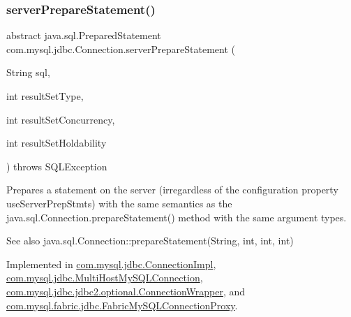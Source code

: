 \subsubsection{\texorpdfstring{server\+Prepare\+Statement()}{serverPrepareStatement()}\hspace{0.1cm}{\footnotesize\ttfamily [4/6]}}
{\footnotesize\ttfamily abstract java.\+sql.\+Prepared\+Statement com.\+mysql.\+jdbc.\+Connection.\+server\+Prepare\+Statement (\begin{DoxyParamCaption}\item[{String}]{sql,  }\item[{int}]{result\+Set\+Type,  }\item[{int}]{result\+Set\+Concurrency,  }\item[{int}]{result\+Set\+Holdability }\end{DoxyParamCaption}) throws S\+Q\+L\+Exception\hspace{0.3cm}{\ttfamily [abstract]}}

Prepares a statement on the server (irregardless of the configuration property \textquotesingle{}use\+Server\+Prep\+Stmts\textquotesingle{}) with the same semantics as the java.\+sql.\+Connection.\+prepare\+Statement() method with the same argument types.

\begin{DoxySeeAlso}{See also}
java.\+sql.\+Connection\+::prepare\+Statement(\+String, int, int, int) 
\end{DoxySeeAlso}


Implemented in \mbox{\hyperlink{classcom_1_1mysql_1_1jdbc_1_1_connection_impl_afda4b5397a3241273af80d0ba702c6a0}{com.\+mysql.\+jdbc.\+Connection\+Impl}}, \mbox{\hyperlink{classcom_1_1mysql_1_1jdbc_1_1_multi_host_my_s_q_l_connection_ac7585cb7791fb3f439f1dec002b9486e}{com.\+mysql.\+jdbc.\+Multi\+Host\+My\+S\+Q\+L\+Connection}}, \mbox{\hyperlink{classcom_1_1mysql_1_1jdbc_1_1jdbc2_1_1optional_1_1_connection_wrapper_aa5144167983b1257bdf575d8349e1fbe}{com.\+mysql.\+jdbc.\+jdbc2.\+optional.\+Connection\+Wrapper}}, and \mbox{\hyperlink{classcom_1_1mysql_1_1fabric_1_1jdbc_1_1_fabric_my_s_q_l_connection_proxy_a2465abeeee2f1a83f9a2632f3c577a6b}{com.\+mysql.\+fabric.\+jdbc.\+Fabric\+My\+S\+Q\+L\+Connection\+Proxy}}.

\mbox{\label{interfacecom_1_1mysql_1_1jdbc_1_1_connection_ad56f84a142159320cb267e94febd72d9}} 
